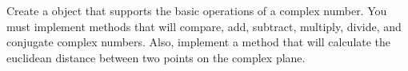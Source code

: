 \begin{problem}
Create a  object that supports the basic operations of a complex number.
You must implement methods that will compare, add, subtract, multiply, divide, and conjugate complex numbers.
Also, implement a  method that will calculate the euclidean distance between two points on the complex plane.
\end{problem}


